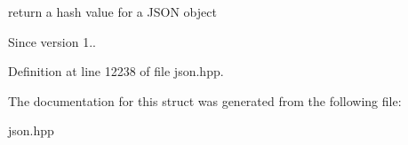 return a hash value for a J\+S\+O\+N object 

\begin{DoxySince}{Since}
version 1.. 
\end{DoxySince}


Definition at line 12238 of file json.\+hpp.



The documentation for this struct was generated from the following file\+:\begin{DoxyCompactItemize}
\item 
json.\+hpp\end{DoxyCompactItemize}
